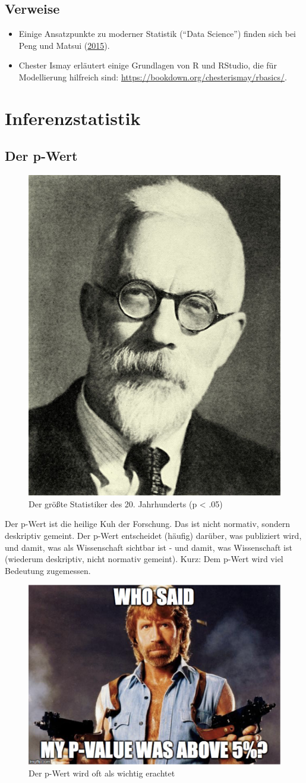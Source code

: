 \documentclass[12pt,]{book}
\begin{document}
\section{Verweise}\label{verweise-4}

\begin{itemize}
\item
  Einige Ansatzpunkte zu moderner Statistik (``Data Science'') finden
  sich bei Peng und Matsui (\protect\hyperlink{ref-peng2015art}{2015}).
\item
  Chester Ismay erläutert einige Grundlagen von R und RStudio, die für
  Modellierung hilfreich sind:
  \url{https://bookdown.org/chesterismay/rbasics/}.
\end{itemize}

\chapter{Inferenzstatistik}\label{inferenzstatistik}

\section{Der p-Wert}\label{der-p-wert}

\begin{figure}
\includegraphics[width=0.1\linewidth]{images/Ronald_Fisher} \caption{Der größte Statistiker des 20. Jahrhunderts (p < .05)}\label{fig:sir-fisher}
\end{figure}

Der p-Wert ist die heilige Kuh der Forschung. Das ist nicht normativ,
sondern deskriptiv gemeint. Der p-Wert entscheidet (häufig) darüber, was
publiziert wird, und damit, was als Wissenschaft sichtbar ist - und
damit, was Wissenschaft ist (wiederum deskriptiv, nicht normativ
gemeint). Kurz: Dem p-Wert wird viel Bedeutung zugemessen.

\begin{figure}
\includegraphics[width=6.5in]{images/p_value_who_said} \caption{Der p-Wert wird oft als wichtig erachtet}\label{fig:who-said}
\end{figure}
\end{document}
